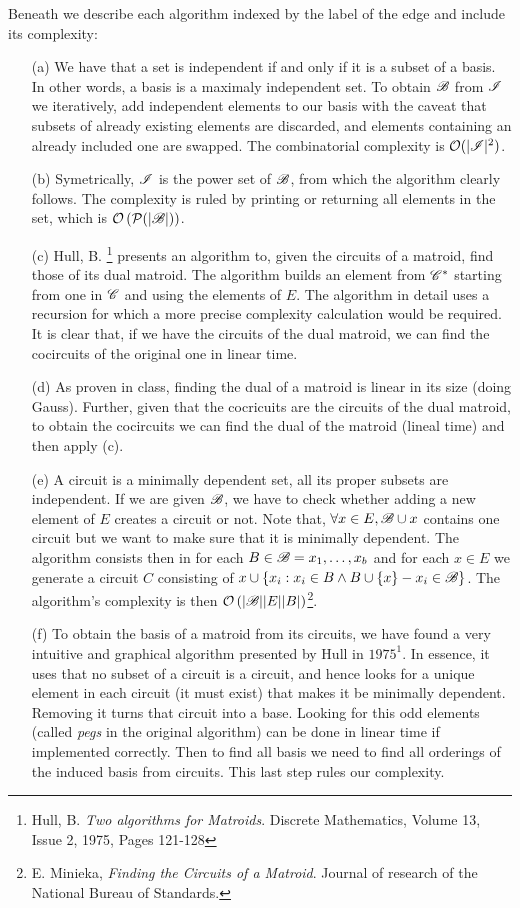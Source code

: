 Beneath we describe each algorithm indexed by the label of the edge and include its complexity:
\begin{itemize}
    \item[(a)] 
        We have that a set is independent if and only if it is a subset of a basis.
        In other words, a basis is a maximaly independent set.
        To obtain $\mathscr{B}$ from $\mathscr{I}$ we iteratively, add independent elements to our basis with the caveat that subsets of already existing elements are discarded, and elements containing an already included one are swapped.
        The combinatorial complexity is $\mathcal{O}(|\mathscr{I}|^2)$.
    \item[(b)] Symetrically, $\mathscr{I}$ is the power set of $\mathscr{B}$, from which the algorithm clearly follows. The complexity is ruled by printing or returning all elements in the set, which is $\mathcal{O}\left(\mathcal{P}(|\mathscr{B}|)\right)$.
    \item[(c)] Hull, B. \footnote{Hull, B. \textit{Two algorithms for Matroids}. Discrete Mathematics, Volume 13, Issue 2, 1975, Pages 121-128} presents an algorithm to, given the circuits of a matroid, find those of its dual matroid. The algorithm builds an element from $\mathscr{C}^*$ starting from one in $\mathscr{C}$ and using the elements of $E$. The algorithm in detail uses a recursion for which a more precise complexity calculation would be required. It is clear that, if we have the circuits of the dual matroid, we can find the cocircuits of the original one in linear time.
    \item[(d)] As proven in class, finding the dual of a matroid is linear in its size (doing Gauss). Further, given that the cocricuits are the circuits of the dual matroid, to obtain the cocircuits we can find the dual of the matroid (lineal time) and then apply (c).
    \item[(e)] A circuit is a minimally dependent set, all its proper subsets are independent. If we are given $\mathscr{B}$, we have to check whether adding a new element of $E$ creates a circuit or not. Note that, $\forall x \in E, \mathscr{B} \cup x$ contains one circuit but we want to make sure that it is minimally dependent. The algorithm consists then in for each $B \in \mathscr{B} = {x_1, \dots, x_b}$ and for each $x \in E$ we generate a circuit $C$ consisting of $x \cup \lbrace x_i : x_i \in B \wedge B \cup \{ x\} - x_i \in \mathscr{B} \rbrace$. The algorithm's complexity is then $\mathcal{O}\left(|\mathscr{B}||E||B|\right)$\footnote{E. Minieka, \textit{Finding the Circuits of a Matroid}. Journal of research of the National Bureau of Standards.}.
    \item[(f)] To obtain the basis of a matroid from its circuits, we have found a very intuitive and graphical algorithm presented by Hull in $1975^1$. In essence, it uses that no subset of a circuit is a circuit, and hence looks for a unique element in each circuit (it must exist) that makes it be minimally dependent. Removing it turns that circuit into a base. Looking for this odd elements (called \textit{pegs} in the original algorithm) can be done in linear time if implemented correctly. Then to find all basis we need to find all orderings of the induced basis from circuits. This last step rules our complexity.

\end{itemize}
